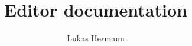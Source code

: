 \documentclass[12pt, a4paper]{article}
\begin{document}
\title{Editor documentation}
\author{Lukas Hermann}
\maketitle

\tableofcontents

\newpage



\end{document}

